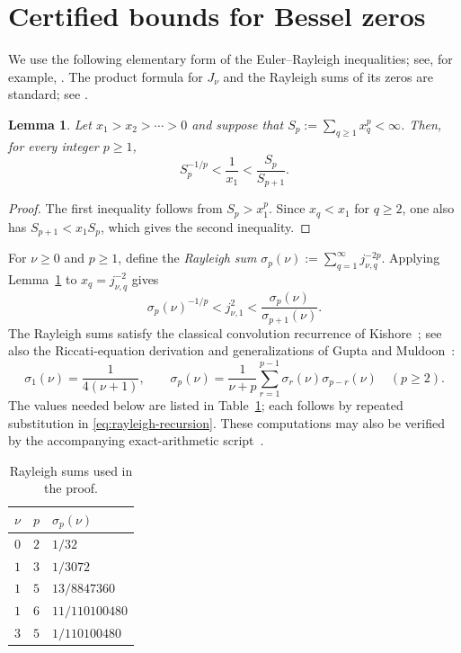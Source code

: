 \documentclass[11pt,letterpaper,reqno]{amsart}
\newtheorem{lemma}[lemma]{Lemma}
\theoremstyle{definition}
\begin{document}
\section{Certified bounds for Bessel zeros}\label{sec:bessel}

We use the following elementary form of the Euler--Rayleigh inequalities;
see, for example, \cite[Lemma~3.2]{IsmailMuldoon1995}. The product formula for \(J_\nu\) and the Rayleigh sums of its zeros are standard; see \cite[\S10.21(iii),(xiii)]{DLMF}.


\begin{lemma}\label{lem:euler-rayleigh}
Let $x_1>x_2>\cdots>0$ and suppose that
$S_p:=\sum_{q\geq1}x_q^p<\infty$.  Then, for every integer $p\geq1$,
\[
 S_p^{-1/p}<\frac1{x_1}<\frac{S_p}{S_{p+1}}.
\]
\end{lemma}

\begin{proof}
The first inequality follows from $S_p>x_1^p$.  Since $x_q<x_1$ for
$q\geq2$, one also has $S_{p+1}<x_1S_p$, which gives the second inequality.
\end{proof}

For $\nu\geq0$ and $p\geq1$, define the \emph{Rayleigh sum}
$\sigma_p(\nu):=\sum_{q=1}^\infty j_{\nu,q}^{-2p}$.  Applying
Lemma~\ref{lem:euler-rayleigh} to $x_q=j_{\nu,q}^{-2}$ gives
\begin{equation}\label{eq:euler-rayleigh-bessel}
 \sigma_p(\nu)^{-1/p}<j_{\nu,1}^2
 <\frac{\sigma_p(\nu)}{\sigma_{p+1}(\nu)}.
\end{equation}
The Rayleigh sums satisfy the classical convolution recurrence of
Kishore~\cite{Kishore1963}; see also the Riccati-equation derivation and
generalizations of Gupta and Muldoon~\cite{GuptaMuldoon2000}:
\begin{equation}\label{eq:rayleigh-recursion}
 \sigma_1(\nu)=\frac{1}{4(\nu+1)},
 \qquad
 \sigma_p(\nu)=\frac{1}{\nu+p}
 \sum_{r=1}^{p-1}\sigma_r(\nu)\sigma_{p-r}(\nu)
 \quad(p\geq2).
\end{equation}
The values needed below are listed in Table~\ref{tab:rayleigh-sums}; each
follows by repeated substitution in \eqref{eq:rayleigh-recursion}.
These computations may also be verified by the accompanying exact-arithmetic
script~\cite{ExactArithmeticCode}.


\begin{table}[ht]
\centering
\caption{Rayleigh sums used in the proof.}\label{tab:rayleigh-sums}
\begin{tabular}{ccl}
\toprule
$\nu$ & $p$ & $\sigma_p(\nu)$ \\
\midrule
$0$ & $2$ & $1/32$ \\
$1$ & $3$ & $1/3072$ \\
$1$ & $5$ & $13/8847360$ \\
$1$ & $6$ & $11/110100480$ \\
$3$ & $5$ & $1/110100480$ \\
\bottomrule
\end{tabular}
\end{table}
\end{document}
